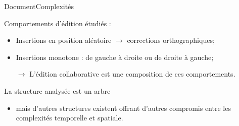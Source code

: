 \begin{frame}{Document}{Complexités}

  \begin{minipage}{0.45\textwidth}
    \begin{center}
      
    \end{center}
  \end{minipage}
  \hfill
  \begin{minipage}{0.45\textwidth}
    \begin{center}
      
    \end{center}
  \end{minipage}

  \vspace{0.5cm}
  
  Comportements d'édition étudiés :
  \begin{itemize}
  \item Insertions en position aléatoire $\rightarrow$ corrections orthographiques;
  \item Insertions monotone : de gauche à droite ou de droite à gauche;
  \item [$\rightarrow$] L'édition collaborative est une composition de ces
    comportements.
  \end{itemize}
  

  \vspace{0.5cm}
  
  La structure analysée est un arbre 
  \begin{itemize}
  \item mais d'autres structures existent offrant d'autres compromis entre les
    complexités temporelle et spatiale.
  \end{itemize}

\end{frame}

